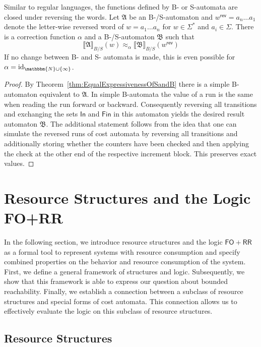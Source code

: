 \documentclass{LMCS}
\newcommand{\nat}{\mathbbm{N}}
\newcommand{\natInf}{\nat \cup \{ \infty \}}
\newcommand{\automatonA}{\mathfrak A}
\newcommand{\automatonB}{\mathfrak B}
\newcommand{\In}{\mathsf{In}}
\newcommand{\Fin}{\mathsf{Fin}}
\newcommand{\semantics}[1]{\llbracket#1\rrbracket}
\newcommand{\costEquiv}[1][\alpha]{\approx_{#1}}
\newcommand{\rev}{\mathsf{rev}}
\newcommand{\FORR}{\ensuremath{\mathsf{FO\!\!+\!\!RR}}}
\begin{document}
\begin{rem}\label{rem:ClosureUnderReversing}
	Similar to regular languages, the functions defined by B- or S-automata are
	closed under reversing the words. 
	Let $\automatonA$ be an B-/S-automaton and $w^\rev = a_n\ldots a_1$ denote
    the letter-wise reversed word of $w = a_1\ldots a_n$ for $w \in \Sigma^*$
    and $a_i \in \Sigma$. There is a correction function $\alpha$ and 
    a B-/S-automaton $\automatonB$ such that 
\[
	\semantics{\automatonA}_{B/S}(w) \costEquiv
    \semantics{\automatonB}_{B/S}(w^\rev)
\]
	If no change between B- and S- automata is made, this is even possible for
	$\alpha = \mathrm{id}_{\natInf}$. 
\end{rem}
\begin{proof}
	By Theorem~\ref{thm:EqualExpressivenessOfSandB} there is a simple
B-automaton equivalent to $\automatonA$. In simple B-automata the value of a
run is the same when reading the run forward or backward. Consequently
reversing all transitions and exchanging the sets $\In$ and $\Fin$ in this 
automaton yields the desired result automaton $\automatonB$. 
The additional statement follows from the idea that one can simulate the 
reversed runs of cost automata by reversing all transitions and additionally 
storing whether the counters have been checked and then applying the check at
the other end of the respective increment block. This preserves exact values.
\end{proof}  





\section{Resource Structures and the Logic FO+RR}
\label{sec:ResourceStructuresAndLogic}

In the following section, we introduce resource structures and the logic
\FORR{} as a formal tool to represent systems with resource consumption and
specify combined properties on the behavior and resource consumption
of the system. First, we define a general framework of structures and logic.
Subsequently, we show that this framework is able to express our question
about bounded reachability. Finally, we establish a connection between a
subclass of resource structures and special forms of cost automata. This
connection allows us to effectively evaluate the logic on this subclass of resource
structures.

\subsection{Resource Structures}
\label{subsec:ResourceStructures}
\end{document}
